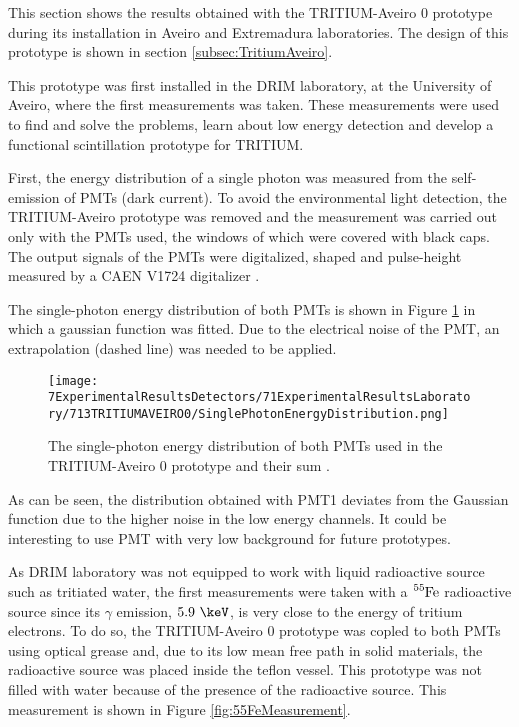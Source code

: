 This section shows the results obtained with the TRITIUM-Aveiro 0 prototype during its installation in Aveiro and Extremadura laboratories. The design of this prototype is shown in section \ref{subsec:TritiumAveiro}.

This prototype was first installed in the DRIM laboratory, at the University of Aveiro, where the first measurements was taken. These measurements were used to find and solve the problems, learn about low energy detection and develop a functional scintillation prototype for TRITIUM. 

First, the energy distribution of a single photon was measured from the self-emission of PMTs (dark current). To avoid the environmental light detection, the TRITIUM-Aveiro prototype was removed and the measurement was carried out only with the PMTs used, the windows of which were covered with black caps. The output signals of the PMTs were digitalized, shaped and pulse-height measured by a CAEN V1724 digitalizer \cite{CAENV1724}.

The single-photon energy distribution of both PMTs is shown in Figure \ref{fig:SinglePhotonEnergyDistribution} in which a gaussian function was fitted. Due to the electrical noise of the PMT, an extrapolation (dashed line) was needed to be applied.

\begin{figure}[h]
\centering
\texttt{[image: 7ExperimentalResultsDetectors/71ExperimentalResultsLaboratory/713TRITIUMAVEIRO0/SinglePhotonEnergyDistribution.png]}
\caption{The single-photon energy distribution of both PMTs used in the TRITIUM-Aveiro 0 prototype and their sum \cite{ExperimentalPaperCarlos}.\label{fig:SinglePhotonEnergyDistribution}}
\end{figure}

As can be seen, the distribution obtained with PMT1 deviates from the Gaussian function due to the higher noise in the low energy channels. It could be interesting to use PMT with very low background for future prototypes.

As DRIM laboratory was not equipped to work with liquid radioactive source such as tritiated water, the first measurements were taken with a $\ce{^{55}Fe}$ radioactive source since its $\gamma$ emission, $5.9~\keV$, is very close to the energy of tritium electrons. To do so, the TRITIUM-Aveiro 0 prototype was copled to both PMTs using optical grease and, due to its low mean free path in solid materials, the radioactive source was placed inside the teflon vessel. This prototype was not filled with water because of the presence of the radioactive source. This measurement is shown in Figure \ref{fig:55FeMeasurement}.


